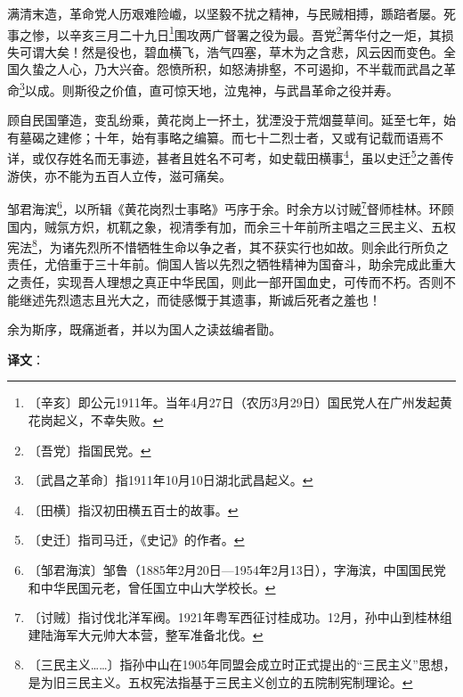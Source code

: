 \documentclass[12pt,UTF-8,openany,a4]{ctexbook}
\begin{document}
\begin{large}
    
    满清末造，革命党人历艰难险巇，以坚毅不扰之精神，与民贼相搏，踬踣者屡。死事之惨，以辛亥三月二十九日\footnote{〔辛亥〕\yiwen 即公元1911年。当年4月27日（农历3月29日）国民党人在广州发起黄花岗起义，不幸失败。}围攻两广督署之役为最。吾党\footnote{〔吾党〕\yiwen 指国民党。}菁华付之一炬，其损失可谓大矣！然是役也，碧血横飞，浩气四塞，草木为之含悲，风云因而变色。全国久蛰之人心，乃大兴奋。怨愤所积，如怒涛排壑，不可遏抑，不半载而武昌之革命\footnote{〔武昌之革命〕\yiwen 指1911年10月10日湖北武昌起义。}以成。则斯役之价值，直可惊天地，泣鬼神，与武昌革命之役并寿。
    
    顾自民国肇造，变乱纷乘，黄花岗上一抔土，犹湮没于荒烟蔓草间。延至七年，始有墓碣之建修；十年，始有事略之编纂。而七十二烈士者，又或有记载而语焉不详，或仅存姓名而无事迹，甚者且姓名不可考，如史载田横事\footnote{〔田横〕\yiwen 指汉初田横五百士的故事。}，虽以史迁\footnote{〔史迁〕\yiwen 指司马迁，《史记》的作者。}之善传游侠，亦不能为五百人立传，滋可痛矣。
    
    邹君海滨\footnote{〔邹君海滨〕\yiwen 邹鲁（1885年2月20日—1954年2月13日），字海滨，中国国民党和中华民国元老，曾任国立中山大学校长。}，以所辑《黄花岗烈士事略》丐序于余。时余方以讨贼\footnote{〔讨贼〕\yiwen 指讨伐北洋军阀。1921年粤军西征讨桂成功。12月，孙中山到桂林组建陆海军大元帅大本营，整军准备北伐。}督师桂林。环顾国内，贼氛方炽，杌靰之象，视清季有加，而余三十年前所主唱之三民主义、五权宪法\footnote{〔三民主义……〕\yiwen 指孙中山在1905年同盟会成立时正式提出的“三民主义”思想，是为旧三民主义。五权宪法指基于三民主义创立的五院制宪制理论。}，为诸先烈所不惜牺牲生命以争之者，其不获实行也如故。则余此行所负之责任，尤倍重于三十年前。倘国人皆以先烈之牺牲精神为国奋斗，助余完成此重大之责任，实现吾人理想之真正中华民国，则此一部开国血史，可传而不朽。否则不能继述先烈遗志且光大之，而徒感慨于其遗事，斯诚后死者之羞也！
    
    余为斯序，既痛逝者，并以为国人之读兹编者勖。

\end{large}


\newpage

\begin{Large}
   \noindent \textbf{译文}：
\end{Large}

\vspace{1em}
\end{document}
